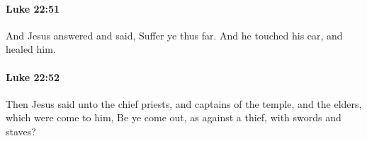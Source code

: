 		\paragraph{Luke 22:51} %
			\label{LUKE-22-51}

			And Jesus answered and said, Suffer ye thus far. And he touched his ear, and healed him.

			\begin{framed}
			\scriptsize
				\begin{compactdesc}
					\item[SBLG] 
				\end{compactdesc}
			\end{framed}

		\paragraph{Luke 22:52} %
			\label{LUKE-22-52}

			Then Jesus said unto the chief priests, and captains of the temple, and the elders, which were come to him, Be ye come out, as against a thief, with swords and staves?

